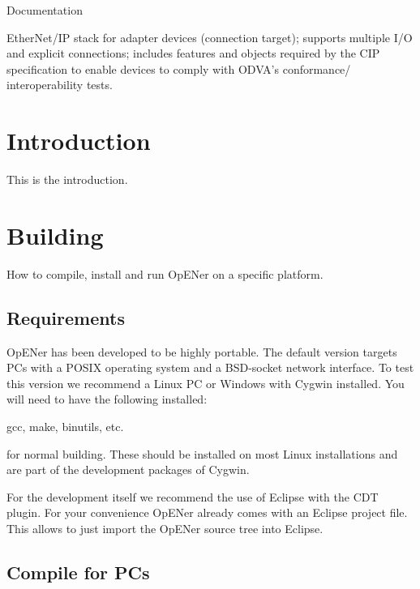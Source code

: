 \-Documentation

\-Ether\-Net/\-I\-P stack for adapter devices (connection target); supports multiple \-I/\-O and explicit connections; includes features and objects required by the \-C\-I\-P specification to enable devices to comply with \-O\-D\-V\-A's conformance/ interoperability tests.\hypertarget{index_intro_sec}{}\section{\-Introduction}\label{index_intro_sec}
\-This is the introduction.\hypertarget{index_install_sec}{}\section{\-Building}\label{index_install_sec}
\-How to compile, install and run \-Op\-E\-Ner on a specific platform.\hypertarget{index_build_req_sec}{}\subsection{\-Requirements}\label{index_build_req_sec}
\-Op\-E\-Ner has been developed to be highly portable. \-The default version targets \-P\-Cs with a \-P\-O\-S\-I\-X operating system and a \-B\-S\-D-\/socket network interface. \-To test this version we recommend a \-Linux \-P\-C or \-Windows with \-Cygwin installed. \-You will need to have the following installed\-:
\begin{DoxyItemize}
\item gcc, make, binutils, etc.
\end{DoxyItemize}

for normal building. \-These should be installed on most \-Linux installations and are part of the development packages of \-Cygwin.

\-For the development itself we recommend the use of \-Eclipse with the \-C\-D\-T plugin. \-For your convenience \-Op\-E\-Ner already comes with an \-Eclipse project file. \-This allows to just import the \-Op\-E\-Ner source tree into \-Eclipse.\hypertarget{index_compile_pcs_sec}{}\subsection{\-Compile for P\-Cs}\label{index_compile_pcs_sec}

